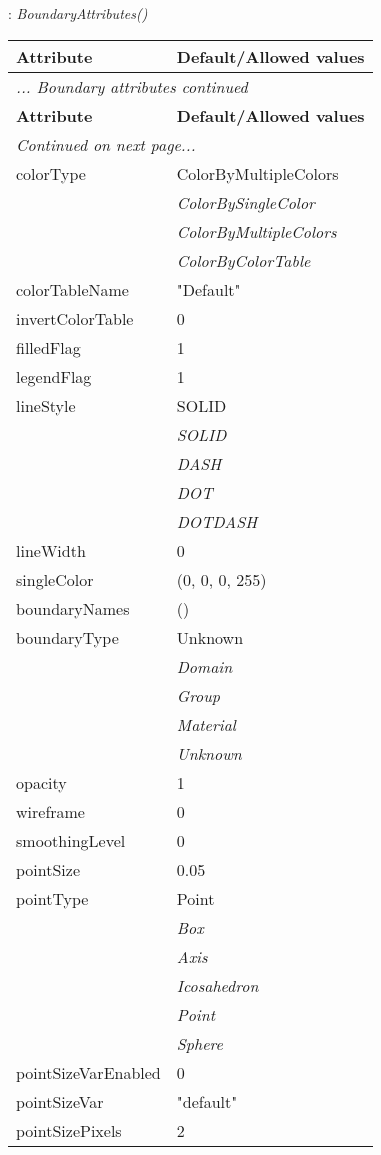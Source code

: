\documentclass[10pt,a4paper]{report}
\begin{document}
\newpage

{}
: {\it BoundaryAttributes() }\\[-3mm]

\begin{longtable}{ll}
{\bf Attribute} & {\bf Default/Allowed values} \\
\hline \hline
\endfirsthead
\multicolumn{2}{l}{{\it ... Boundary attributes continued}} \\
{\bf Attribute} & {\bf Default/Allowed values} \\
\hline \hline
\endhead
\hline
\multicolumn{2}{l}{{\it Continued on next page...}} \\
\endfoot
\hline
\endlastfoot

colorType  &  ColorByMultipleColors   \\
 & {\it  ColorBySingleColor} \\
 & {\it  ColorByMultipleColors} \\
 & {\it  ColorByColorTable} \\
colorTableName  &  "Default" \\
invertColorTable  &  0 \\
filledFlag  &  1 \\
legendFlag  &  1 \\
lineStyle  &  SOLID   \\
 & {\it  SOLID} \\
 & {\it  DASH} \\
 & {\it  DOT} \\
 & {\it  DOTDASH} \\
lineWidth  &  0 \\
singleColor  &  (0, 0, 0, 255) \\
boundaryNames  &  () \\
boundaryType  &  Unknown   \\
 & {\it  Domain} \\
 & {\it  Group} \\
 & {\it  Material} \\
 & {\it  Unknown} \\
opacity  &  1 \\
wireframe  &  0 \\
smoothingLevel  &  0 \\
pointSize  &  0.05 \\
pointType  &  Point   \\
 & {\it  Box} \\
 & {\it  Axis} \\
 & {\it  Icosahedron} \\
 & {\it  Point} \\
 & {\it  Sphere} \\
pointSizeVarEnabled  &  0 \\
pointSizeVar  &  "default" \\
pointSizePixels  &  2 \\
\end{longtable}
\end{document}

